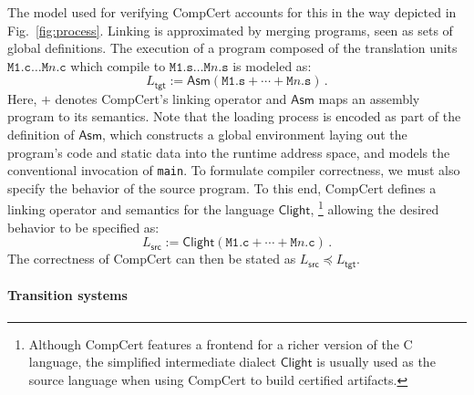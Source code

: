 \documentclass[acmsmall,screen,review,anonymous]{acmart}
\newcommand{\kw}[1]{\ensuremath{ \mathsf{#1} }}
\newcommand{\refby}{\preceq}
\newcommand{\opt}[2]{#1}
\newcommand{\opt}[2]{#2}
\begin{document}
The model used for verifying CompCert accounts for this
\opt{in the way depicted in Fig.~\ref{fig:process}.}%
    {in the following way.}
Linking is approximated by
merging programs, seen as sets of global definitions.
The execution
of a program composed of the translation units
$\texttt{M1.c} \ldots \texttt{M$n$.c}$
which compile to
$\texttt{M1.s} \ldots \texttt{M$n$.s}$
is modeled as:
\[
    L_\kw{tgt} :=
    \kw{Asm}(\texttt{M1.s} +
             \cdots +
             \texttt{M$n$.s}) \,.
\]
Here,
$+$ denotes CompCert's linking operator and
$\kw{Asm}$ maps an assembly program to its semantics.
Note that the loading process is encoded
as part of the definition of $\kw{Asm}$,
which constructs a global environment
laying out the program's code and static data
into the runtime address space,
and models the conventional invocation of \texttt{main}.
To formulate compiler correctness,
we must also specify the behavior of the source program.
To this end,
CompCert defines a linking operator
and semantics
for the language $\kw{Clight}$,%
\footnote{
  Although CompCert features a frontend for a richer version
  of the C language,
  the simplified intermediate dialect \kw{Clight}
  is usually used as the source language
  when using CompCert to build certified artifacts.
}
allowing the desired behavior to be specified as:
\[
    L_\kw{src} :=
    \kw{Clight}(\texttt{M1.c} + \cdots + \texttt{M$n$.c}) \,.
\]
The correctness of CompCert
can then be stated as $L_\kw{src} \refby L_\kw{tgt}$.

\paragraph{Transition systems} %
\end{document}
